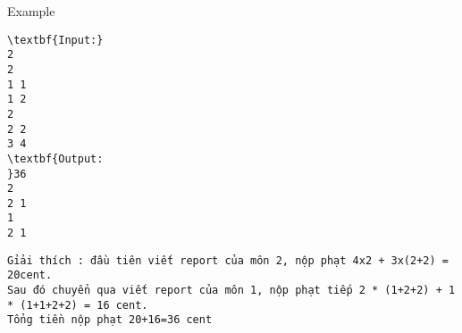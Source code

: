 Example
\begin{verbatim}
\textbf{Input:}
2
2
1 1
1 2
2
2 2
3 4
\textbf{Output:
}36
2
2 1
1
2 1\end{verbatim}
\begin{verbatim}
Gỉải thích : đầu tiên viết report của môn 2, nộp phạt 4x2 + 3x(2+2) = 20cent.
Sau đó chuyển qua viết report của môn 1, nộp phạt tiếp 2 * (1+2+2) + 1 * (1+1+2+2) = 16 cent. 
Tổng tiền nộp phạt 20+16=36 cent
\end{verbatim}
